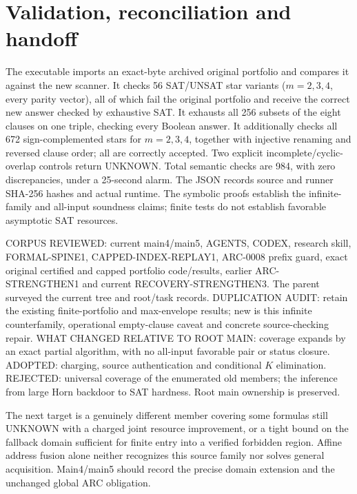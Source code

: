 \documentclass[11pt]{article}
\begin{document}
\section{Validation, reconciliation and handoff}
The executable imports an exact-byte archived original portfolio and compares it against the new scanner. It checks 56 SAT/UNSAT star variants ($m=2,3,4$, every parity vector), all of which fail the original portfolio and receive the correct new answer checked by exhaustive SAT. It exhausts all 256 subsets of the eight clauses on one triple, checking every Boolean answer. It additionally checks all 672 sign-complemented stars for $m=2,3,4$, together with injective renaming and reversed clause order; all are correctly accepted. Two explicit incomplete/cyclic-overlap controls return UNKNOWN. Total semantic checks are 984, with zero discrepancies, under a 25-second alarm. The JSON records source and runner SHA-256 hashes and actual runtime. The symbolic proofs establish the infinite-family and all-input soundness claims; finite tests do not establish favorable asymptotic SAT resources.

CORPUS REVIEWED: current main4/main5, AGENTS, CODEX, research skill, FORMAL-SPINE1, CAPPED-INDEX-REPLAY1, ARC-0008 prefix guard, exact original certified and capped portfolio code/results, earlier ARC-STRENGTHEN1 and current RECOVERY-STRENGTHEN3. The parent surveyed the current tree and root/task records. DUPLICATION AUDIT: retain the existing finite-portfolio and max-envelope results; new is this infinite counterfamily, operational empty-clause caveat and concrete source-checking repair. WHAT CHANGED RELATIVE TO ROOT MAIN: coverage expands by an exact partial algorithm, with no all-input favorable pair or status closure. ADOPTED: charging, source authentication and conditional $K$ elimination. REJECTED: universal coverage of the enumerated old members; the inference from large Horn backdoor to SAT hardness. Root main ownership is preserved.

The next target is a genuinely different member covering some formulas still UNKNOWN with a charged joint resource improvement, or a tight bound on the fallback domain sufficient for finite entry into a verified forbidden region. Affine address fusion alone neither recognizes this source family nor solves general acquisition. Main4/main5 should record the precise domain extension and the unchanged global ARC obligation.
\end{document}
